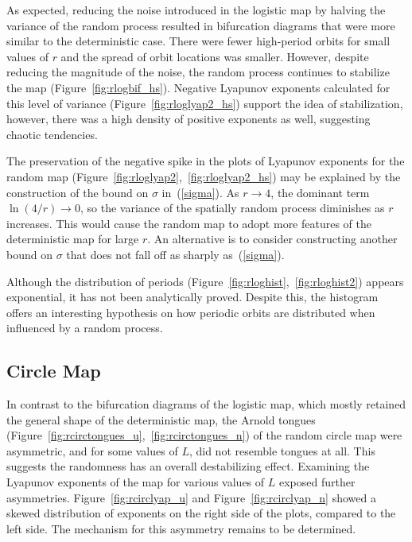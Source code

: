 As expected, reducing the noise introduced in the logistic
map by halving the variance of the random process resulted in
bifurcation diagrams that were more similar to the deterministic
case. There were fewer high-period orbits for small values of $r$ and the spread of orbit
locations was smaller. However, despite reducing
the magnitude of the noise, the random process continues to stabilize
the map (Figure~\ref{fig:rlogbif_hs}). Negative Lyapunov exponents calculated
for this level of variance (Figure~\ref{fig:rloglyap2_hs}) support the
idea of stabilization, however, there was a high density of positive
exponents as well, suggesting chaotic tendencies.

The preservation of the negative spike in the plots of Lyapunov
exponents for the random map
(Figure~\ref{fig:rloglyap2},~\ref{fig:rloglyap2_hs}) may be explained
by the construction of the bound on $\sigma$ in~(\ref{sigma}). As $r \to 4$, the
dominant term $\ln(4/r)
\to 0$, so the variance of the spatially random process diminishes as
$r$ increases. This would cause the random map to adopt more features
of the deterministic map for large $r$. An alternative is to consider constructing
another bound on $\sigma$ that does not fall off as sharply as~(\ref{sigma}).

Although the distribution of periods (Figure~\ref{fig:rloghist},~\ref{fig:rloghist2})
appears exponential, it has not been analytically proved. Despite this, the
histogram offers an interesting hypothesis on how periodic orbits are
distributed when influenced by a random process. 
\subsection{Circle Map}
In contrast to the bifurcation diagrams of the logistic map, which
mostly retained the general shape of the deterministic map, the
Arnold tongues (Figure~\ref{fig:rcirctongues_u},~\ref{fig:rcirctongues_n}) of the
random circle map were asymmetric, and for some values of $L$, did not
resemble tongues at all. This suggests the randomness has an overall
destabilizing effect. Examining the Lyapunov exponents of the map
for various values of $L$ exposed further asymmetries. Figure~\ref{fig:rcirclyap_u}
and Figure~\ref{fig:rcirclyap_n} showed a skewed distribution of
exponents on the right side of the plots, compared to the left
side. The mechanism for this asymmetry remains to be determined.

